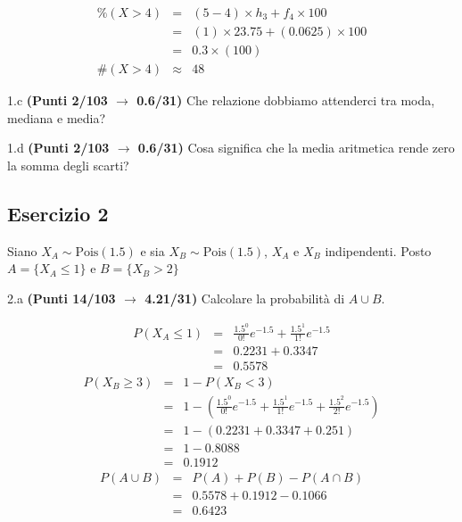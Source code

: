 \documentclass[
  11pt,
]{book}
\theoremstyle{mytheoremstyle}
\theoremstyle{mydefstyle}
\newenvironment{sol}
  {
  \begin{tcolorbox}[enhanced,breakable,arc=0.1mm,boxrule=1pt,colback=white,colframe=iblue,
  title=\bf \fontfamily{lmss}\selectfont \hspace{.5 cm} Soluzione,drop fuzzy shadow]

}{
\end{tcolorbox}
  }
\begin{document}
\begin{sol}
\begin{eqnarray*}
     \%(X> 4 ) &=& ( 5 - 4 )\times h_{ 3 }+ f_{ 4 }\times 100 \\
              &=& ( 1 )\times 23.75 + ( 0.0625 )\times 100 \\
              &=&  0.3 \times(100)\\
     \#(X> 4 ) &\approx& 48 
         \end{eqnarray*}

\end{sol}

1.c \textbf{(Punti 2/103 \(\rightarrow\) 0.6/31)} Che relazione dobbiamo attenderci tra moda, mediana e media?

1.d \textbf{(Punti 2/103 \(\rightarrow\) 0.6/31)} Cosa significa che la media aritmetica rende zero la somma degli scarti?

\subsection{Esercizio 2}\label{esercizio-2-26}

Siano \(X_A\sim \text{Pois}(1.5)\) e sia \(X_B\sim \text{Pois}(1.5)\), \(X_A\) e \(X_B\) indipendenti. Posto \(A=\{X_A\le 1\}\) e \(B=\{X_B>2\}\)

2.a \textbf{(Punti 14/103 \(\rightarrow\) 4.21/31)} Calcolare la probabilità di \(A\cup B\).

\begin{sol}
\begin{eqnarray*}
   P( X_A \leq 1 ) &=& \frac{ 1.5 ^{ 0 }}{ 0 !}e^{- 1.5 }+\frac{ 1.5 ^{ 1 }}{ 1 !}e^{- 1.5 } \\                 &=& 0.2231+0.3347 \\                 &=& 0.5578 
\end{eqnarray*}
\begin{eqnarray*}
   P( X_B \geq 3 ) &=& 1-P( X_B < 3 ) \\                 &=& 1-\left( \frac{ 1.5 ^{ 0 }}{ 0 !}e^{- 1.5 }+\frac{ 1.5 ^{ 1 }}{ 1 !}e^{- 1.5 }+\frac{ 1.5 ^{ 2 }}{ 2 !}e^{- 1.5 } \right)\\                 &=& 1-( 0.2231+0.3347+0.251 )\\                 &=& 1- 0.8088 \\                 &=&   0.1912 
\end{eqnarray*}
\begin{eqnarray*}
  P(A\cup B) &=&  P(A)+P(B)-P(A\cap B)\\
  &=& 0.5578+0.1912-0.1066\\
  &=& 0.6423
\end{eqnarray*}

\end{sol}
\end{document}
